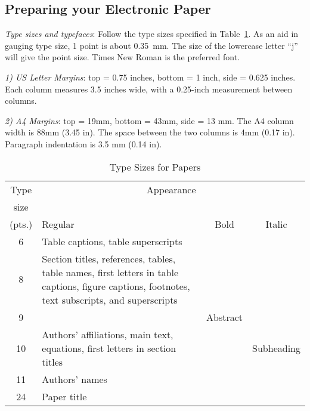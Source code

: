 \subsection{Preparing your Electronic Paper}

{\em Type sizes and typefaces}: Follow the type sizes specified in
Table~\ref{table1}. As an aid in gauging type size, 1 point is
about 0.35~mm. The size of the lowercase letter ``j'' will give
the point size. Times New Roman is the preferred font.

{\em 1) US Letter Margins}:  top = 0.75 inches, bottom = 1 inch, side = 0.625 inches. 
Each column measures 3.5 inches wide, with a 0.25-inch measurement between columns.

{\em 2) A4 Margins}: top = 19mm, bottom = 43mm, side = 13 mm. The A4 column width is 
88mm (3.45 in). The space between the two columns is 4mm (0.17 in). Paragraph indentation 
is 3.5 mm (0.14 in).

\begin{table}[hb]
\begin{center} \caption{Type Sizes for Papers}
\label{table1}
\renewcommand{\arraystretch}{1.3}
\begin{tabular}{|c|p{34mm}|c|c|}
 \hline
Type & \multicolumn{3}{c|}{Appearance} \\
size &\multicolumn{3}{c|}{~} \\ \cline{2-4} (pts.) & Regular &
Bold & Italic \\ \hline
 6 & Table captions\footnotemark[1], table superscripts & & \\ \hline
 8 & Section titles\footnotemark[1], references, tables, table
 names\footnotemark[1],
 first letters in table captions\footnotemark[1], figure captions, footnotes,
 text subscripts, and superscripts &
& \\ \hline
 9 & & Abstract & \\ \hline
 10 & Authors' affiliations, main text, equations, first letters in
 section titles\footnotemark[1] & & Subheading \\ \hline
 11 & Authors' names & & \\ \hline
 24 & Paper title & & \\ \hline
\end{tabular}
\end{center}
\end{table}

